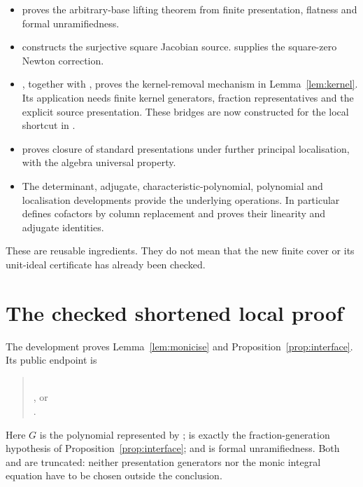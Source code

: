 \documentclass[11pt]{article}
\begin{document}
\begin{itemize}
\item {} proves the
arbitrary-base lifting theorem from finite presentation, flatness and
formal unramifiedness.
\item {} constructs the
surjective square Jacobian source.  supplies
the square-zero Newton correction.
\item {}, together with
, proves the kernel-removal mechanism in
Lemma~\ref{lem:kernel}. Its application needs finite kernel generators,
fraction representatives and the explicit source presentation. These
bridges are now constructed for the local shortcut in
.
\item {}
proves closure of standard presentations under further principal
localisation, with the algebra universal property.
\item The determinant, adjugate, characteristic-polynomial, polynomial
and localisation developments provide the underlying operations.
In particular  defines cofactors by column
replacement and proves their linearity and adjugate identities.
\end{itemize}

These are reusable ingredients. They do not mean that the new finite
cover or its unit-ideal certificate has already been checked.

\section{The checked shortened local proof}

The development  proves
Lemma~\ref{lem:monicise} and Proposition~\ref{prop:interface}.
Its public endpoint is
\begin{quote}\small
{}\\
, or\\
.
\end{quote}
Here $G$ is the polynomial represented by ;  is
exactly the fraction-generation hypothesis of
Proposition~\ref{prop:interface}; and  is formal
unramifiedness. Both  and  are truncated:
neither presentation generators nor the monic integral equation have
to be chosen outside the conclusion.
\end{document}
